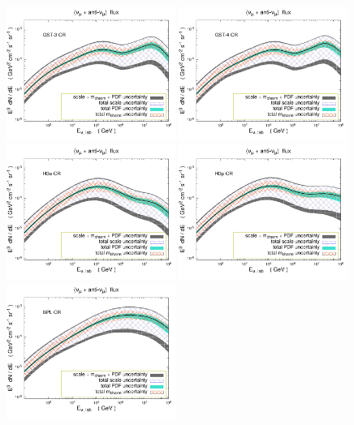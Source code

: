 \documentclass[12pt]{article}
\begin{document}
\begin{figure}
    \centering
    \includegraphics[width=0.49\textwidth]{figs/scalemasspdfunc_prosa19_spettro1_py8.pdf}
    \includegraphics[width=0.49\textwidth]{figs/scalemasspdfunc_prosa19_spettro2_py8.pdf}
    \includegraphics[width=0.49\textwidth]{figs/scalemasspdfunc_prosa19_spettro3_py8.pdf}
    \includegraphics[width=0.49\textwidth]{figs/scalemasspdfunc_prosa19_spettro4_py8.pdf}
    \includegraphics[width=0.49\textwidth]{figs/scalemasspdfunc_prosa19_spettro0_py8.pdf}

\end{figure}
\end{document}
